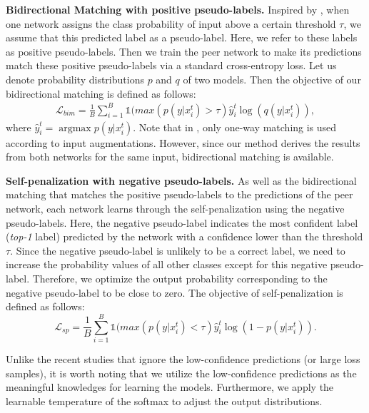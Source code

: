 \documentclass[final]{cvpr}
\begin{document}
\textbf{Bidirectional Matching with positive pseudo-labels.} 
Inspired by \cite{FixMatch, Co-teaching, Co-training}, when one network assigns the class probability of input above a certain threshold $\tau$, we assume that this predicted label as a pseudo-label. Here, we refer to these labels as positive pseudo-labels. Then we train the peer network to make its predictions match these positive pseudo-labels via a standard cross-entropy loss. Let us denote probability distributions $p$ and $q$ of two models. Then the objective of our bidirectional matching is defined as follows:
\begin{equation}
\begin{gathered}
    \mathcal{L}_{bim} = \frac{1}{B}\sum_{i=1}^{B}{\mathds{1}(max(p(y|{x}_i^{t})>\tau) \hat{y}_i^{t} \log(q(y|x_i^{t}))},
\end{gathered}
\end{equation}
where $\hat{y}^{t}_i = \operatorname*{argmax}p(y|{x}_i^{t})$. Note that in \cite{FixMatch}, only one-way matching is used according to input augmentations. However, since our method derives the results from both networks for the same input, bidirectional matching is available.

\textbf{Self-penalization with negative pseudo-labels.} As well as the bidirectional matching that matches the positive pseudo-labels to the predictions of the peer network, each network learns through the self-penalization using the negative pseudo-labels.
Here, the negative pseudo-label indicates the most confident label (\emph{top-1} label) predicted by the network with a confidence lower than the threshold $\tau$. Since the negative pseudo-label is unlikely to be a correct label, we need to increase the probability values of all other classes except for this negative pseudo-label. Therefore, we optimize the output probability corresponding to the negative pseudo-label to be close to zero. The objective of self-penalization is defined as follows:
\begin{equation}
    \mathcal{L}_{sp} = \frac{1}{B}\sum_{i=1}^{B}{\mathds{1}(max(p(y|{x}_i^{t})<\tau) \hat{y}_i^{t} \log(1-p(y|x_i^{t}))}.
\end{equation}


Unlike the recent studies \cite{Co-teaching, FixMatch, MiCo2020} that ignore the low-confidence predictions (or large loss samples), it is worth noting that we utilize the low-confidence predictions as the meaningful knowledges for learning the models. Furthermore, we apply the learnable temperature of the softmax to adjust the output distributions.
\end{document}
